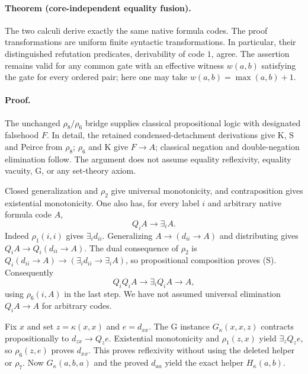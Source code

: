 \paragraph{Theorem (core-independent equality fusion).}
The two calculi derive exactly the same native formula codes. The proof
transformations are uniform finite syntactic transformations. In particular,
their distinguished refutation predicates, derivability of code $1$, agree.
The assertion remains valid for any common gate with an effective witness
$w(a,b)$ satisfying the gate for every ordered pair; here one may take
$w(a,b)=\max(a,b)+1$.

\paragraph{Proof.}
The unchanged $\rho_8/\rho_6$ bridge supplies classical propositional logic
with designated falsehood $F$. In detail, the retained condensed-detachment
derivations give K, S and Peirce from $\rho_8$; $\rho_6$ and K give
$F\to A$; classical negation and double-negation elimination follow. The
argument does not assume equality reflexivity, equality vacuity, G, or any
set-theory axiom.

Closed generalization and $\rho_2$ give universal monotonicity, and
contraposition gives existential monotonicity. One also has, for every
label $i$ and arbitrary native formula code $A$,
\begin{equation}
 Q_iA\longrightarrow\exists_iA.
 \tag{S}
\end{equation}
Indeed $\rho_1(i,i)$ gives $\exists_i d_{ii}$. Generalizing
$A\to(d_{ii}\to A)$ and distributing gives
$Q_iA\to Q_i(d_{ii}\to A)$. The dual consequence of $\rho_2$ is
$Q_i(d_{ii}\to A)\to(\exists_i d_{ii}\to\exists_iA)$, so propositional
composition proves (S). Consequently
\begin{equation}
 Q_iQ_iA\longrightarrow\exists_iQ_iA\longrightarrow A,
 \tag{D}
\end{equation}
using $\rho_6(i,A)$ in the last step. We have not assumed universal
elimination $Q_iA\to A$ for arbitrary codes.

Fix $x$ and set $z=\kappa(x,x)$ and $e=d_{xx}$. The G instance
$G_\kappa(x,x,z)$ contracts propositionally to $d_{zx}\to Q_ze$.
Existential monotonicity and $\rho_1(z,x)$ yield $\exists_zQ_ze$, so
$\rho_6(z,e)$ proves $d_{xx}$. This proves reflexivity without using the
deleted helper or $\rho_7$. Now $G_\kappa(a,b,a)$ and the proved
$d_{aa}$ yield the exact helper $H_\kappa(a,b)$.

